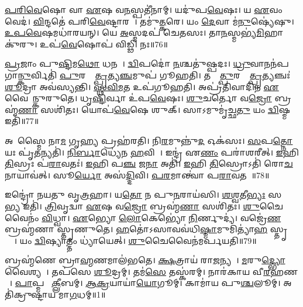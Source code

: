 \ul{𑌪}\ul{𑌰𑌿}\ul{𑌵𑍇}𑌷𑍋 𑌵𑌾 \ul{𑌏}𑌷 𑌵\ul{𑌨}𑌸𑍍𑌪𑌤𑍀॑𑌨𑌾𑌮𑍍।
𑌯𑌦𑍁॑𑌪\ul{𑌵𑍇}𑌷𑌃।
𑌯 \ul{𑌏}𑌵𑌂 𑌵𑍇𑌦॑।
\ul{𑌵𑌿}𑌨𑍍𑌦𑌤𑍇॑ 𑌪𑌰𑌿\ul{𑌵𑍇}𑌷𑍍𑌟𑌾𑌰𑌮𑍍᳚।
𑌤𑌮𑍁॑\ul{𑌤𑍍𑌕}𑌰𑍇।
𑌯𑌂 \ul{𑌦𑍇}𑌵𑌾 𑌮॑\ul{𑌨𑍁}𑌷𑍍𑌯𑍇॑𑌷𑍁।
\ul{𑌉}\ul{𑌪}\ul{𑌵𑍇}𑌷𑌮𑌧𑌾॑𑌰𑌯𑌨𑍍।
𑌯𑍇 \ul{𑌅}𑌸𑍍𑌮𑌦𑌪॑ 𑌚𑍇𑌤𑌸𑌃।
𑌤𑌾\ul{𑌨}𑌸𑍍𑌮𑌭𑍍𑌯॑\ul{𑌮𑌿}𑌹𑌾 𑌕𑍁॑𑌰𑍁।
𑌉𑌪॑\ul{𑌵𑍇}𑌷𑍋𑌪॑ 𑌵𑌿𑌡𑍍𑌢𑌿 𑌨𑌃॥76॥

\ul{𑌪𑍍𑌰}𑌜𑌾𑌂 𑌪𑍁\ul{𑌷𑍍𑌟𑌿}𑌮\ul{𑌥𑍋} 𑌧𑌨𑌮𑍍᳚।
\ul{𑌦𑍍𑌵𑌿}𑌪𑌦𑍋॑ \ul{𑌨}𑌶𑍍𑌚𑌤𑍁॑𑌷𑍍𑌪𑌦𑌃।
\ul{𑌧𑍍𑌰𑍁}𑌵𑌾𑌨𑌨॑𑌪𑌗𑌾\ul{𑌨𑍍𑌕𑍁}𑌰𑍍𑌵𑌿𑌤𑌿॑ \ul{𑌪𑍁}𑌰𑌸𑍍𑌤𑌾᳚\ul{𑌤𑍍𑌪𑍍𑌰}𑌤𑍍𑌯\ul{𑌞𑍍𑌚}𑌮𑍁𑌪॑ 𑌗𑍂𑌹𑌤𑌿।
𑌤𑌸𑍍𑌮𑌾᳚\ul{𑌤𑍍𑌪𑍁}𑌰\-𑌸𑍍𑌤𑌾᳚\ul{𑌤𑍍𑌪𑍍𑌰}𑌤𑍍𑌯𑌞𑍍𑌚𑌃॑ \ul{𑌶𑍂}𑌦𑍍𑌰𑌾 𑌅𑌵॑𑌸𑍍𑌯𑌨𑍍𑌤𑌿।
\ul{𑌸𑍍𑌥}\ul{𑌵𑌿}\ul{𑌮}𑌤 𑌉𑌪॑𑌗𑍂𑌹𑌤𑌿।
𑌅𑌪𑍍𑌰॑𑌤𑌿𑌵𑌾𑌦𑌿𑌨 \ul{𑌏}𑌵𑍈𑌨𑌾᳚𑌨𑍍𑌕𑍁𑌰𑍁𑌤𑍇।
𑌧𑍃\ul{𑌷𑍍𑌟𑌿}𑌰𑍍𑌵𑌾 𑌉॑𑌪\ul{𑌵𑍇}𑌷𑌃।
\ul{𑌶𑍁}𑌚𑌰𑍍𑌤𑍋 𑌵\ul{𑌜𑍍𑌰𑍋} 𑌬𑍍𑌰𑌹𑍍𑌮॑\ul{𑌣𑌾} 𑌸𑌶𑌿॑𑌤𑌃।
𑌯𑍋𑌪॑\ul{𑌵𑍇}𑌷𑍇 𑌶𑍁𑌕𑍍।
𑌸𑌾𑌽𑌮𑍁𑌮𑍃॑𑌚𑍍𑌛\ul{𑌤𑍁} 𑌯𑌂 \ul{𑌦𑍍𑌵𑌿}𑌷𑍍𑌮 𑌇𑌤𑌿॑॥77॥

𑌅𑌥𑌾᳚𑌸𑍍𑌮𑍈 𑌨𑌾\ul{𑌮} 𑌗𑍃\ul{𑌹𑍍𑌯} 𑌪𑍍𑌰𑌹॑𑌰𑌤𑌿।
𑌨𑌿\ul{𑌰}𑌮𑍁𑌨𑍍𑌨𑍁॑\ul{𑌦} 𑌓𑌕॑𑌸𑌃।
\ul{𑌸}𑌪\ul{𑌤𑍍𑌨𑍋} 𑌯𑌃 𑌪𑍃॑\ul{𑌤}𑌨𑍍𑌯𑌤𑌿॑।
\ul{𑌨𑌿}\ul{𑌰𑍍𑌬𑌾}𑌧𑍍𑌯𑍇॑𑌨 \ul{𑌹}𑌵𑌿𑌷𑌾᳚।
𑌇𑌨𑍍𑌦𑍍𑌰॑ 𑌏\ul{𑌣𑌂} 𑌪𑌰𑌾॑𑌶𑌰𑍀𑌤𑍍।
\ul{𑌇}𑌹𑌿 \ul{𑌤𑌿}𑌸𑍍𑌰𑌃 𑌪॑\ul{𑌰𑌾}𑌵𑌤𑌃॑।
\ul{𑌇}𑌹𑌿 𑌪\ul{𑌞𑍍𑌚} 𑌜\ul{𑌨𑌾}\ul{} 𑌅𑌤𑌿॑।
\ul{𑌇}𑌹𑌿 \ul{𑌤𑌿}𑌸𑍍𑌰𑍋𑌽𑌤𑌿॑ 𑌰𑍋\ul{𑌚}𑌨𑌾𑌯𑌾𑌵॑𑌤𑍍।
𑌸𑍂\ul{𑌰𑍍𑌯𑍋} 𑌅𑌸॑\ul{𑌦𑍍𑌦𑌿}𑌵𑌿।
\ul{𑌪}\ul{𑌰}𑌮𑌾𑌨𑍍𑌤𑍍𑌵𑌾॑ 𑌪\ul{𑌰𑌾}𑌵𑌤𑌮𑍍᳚॥78॥

𑌇𑌨𑍍𑌦𑍍𑌰𑍋॑ 𑌨𑌯𑌤𑍁 𑌵𑍃\ul{𑌤𑍍𑌰}𑌹𑌾।
𑌯\ul{𑌤𑍋} 𑌨 𑌪𑍁\ul{𑌨}𑌰𑌾𑌯॑𑌸𑌿।
\ul{𑌶}\ul{𑌶𑍍𑌵}𑌤𑍀\ul{𑌭𑍍𑌯𑌃} 𑌸𑌮𑌾᳚\ul{𑌭𑍍𑌯} 𑌇𑌤𑌿॑।
\ul{𑌤𑍍𑌰𑌿}𑌵𑍃𑌦𑍍𑌵𑌾 \ul{𑌏}𑌷 𑌵\ul{𑌜𑍍𑌰𑍋} 𑌬𑍍𑌰𑌹𑍍𑌮॑\ul{𑌣𑌾} 𑌸𑌶𑌿॑𑌤𑌃।
\ul{𑌶𑍁}𑌚𑍈𑌵𑍈𑌨𑌂॑ \ul{𑌵𑌿}𑌧𑍍𑌵𑌾।
\ul{𑌏}𑌭𑍍𑌯𑍋 \ul{𑌲𑍋}𑌕𑍇𑌭𑍍𑌯𑍋॑ \ul{𑌨𑌿}𑌰𑍍𑌣𑍁𑌦𑍍𑌯॑।
𑌵𑌜𑍍𑌰𑍇॑\ul{𑌣} 𑌬𑍍𑌰𑌹𑍍𑌮॑𑌣𑌾 𑌸𑍍𑌤𑍃𑌣𑍁𑌤𑍇।
\ul{𑌹}𑌤𑍋॑\-𑌽𑌸𑌾𑌵𑌵॑𑌧𑌿\ul{𑌷𑍍𑌮𑌾}𑌮𑍁𑌮𑌿𑌤𑍍𑌯𑌾॑\ul{𑌹} 𑌸𑍍𑌤𑍃𑌤𑍍𑌯𑍈᳚।
𑌯𑌂 \ul{𑌦𑍍𑌵𑌿}𑌷𑍍𑌯𑌾𑌤𑍍𑌤𑌂 𑌧𑍍𑌯𑌾॑𑌯𑍇𑌤𑍍।
\ul{𑌶𑍁}𑌚𑍈𑌵𑍈𑌨॑𑌮𑌰𑍍𑌪𑌯𑌤𑌿॥79॥




\clearpage
{}
\setcounter{anuvakam}{0}

𑌬𑍍𑌰𑌹𑍍𑌮॑𑌣𑍇 𑌬𑍍𑌰𑌾\ul{𑌹𑍍𑌮}𑌣𑌮𑌾𑌲॑𑌭𑌤𑍇।
\ul{𑌕𑍍𑌷}𑌤𑍍𑌰𑌾𑌯॑ 𑌰𑌾\ul{𑌜}𑌨𑍍𑌯𑌮𑍍᳚।
\ul{𑌮}𑌰𑍁\ul{𑌦𑍍𑌭𑍍𑌯𑍋} 𑌵𑍈𑌶𑍍𑌯𑌮𑍍᳚।
𑌤𑌪॑𑌸𑍇 \ul{𑌶𑍂}𑌦𑍍𑌰𑌮𑍍।
𑌤𑌮॑\ul{𑌸𑍇} 𑌤𑌸𑍍𑌕॑𑌰𑌮𑍍।
𑌨𑌾𑌰॑𑌕𑌾𑌯 𑌵𑍀\ul{𑌰}𑌹𑌣𑌮𑍍᳚।
\ul{𑌪𑌾}𑌪𑍍𑌮𑌨𑍇᳚ \ul{𑌕𑍍𑌲𑍀}𑌬𑌮𑍍।
\ul{𑌆}\ul{𑌕𑍍𑌰}𑌯𑌾𑌯𑌾॑\ul{𑌯𑍋}𑌗𑍂𑌮𑍍।
𑌕𑌾𑌮𑌾॑𑌯 𑌪𑍁\ul{𑌶𑍍𑌚}𑌲𑍂𑌮𑍍।
𑌅𑌤𑌿॑𑌕𑍍𑌰𑍁𑌷𑍍𑌟𑌾𑌯 𑌮𑌾\ul{𑌗}𑌧𑌮𑍍॥1॥

